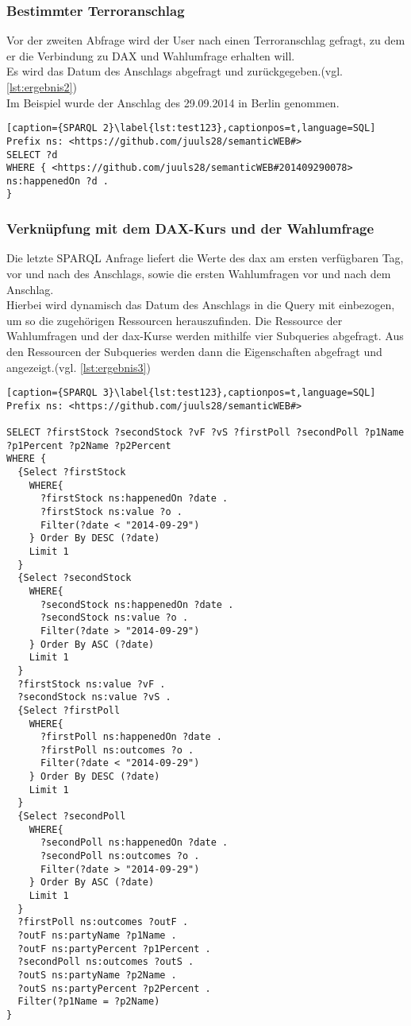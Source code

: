 \documentclass[a4paper,10pt,parskip]{article}
\begin{document}
\subsubsection{Bestimmter Terroranschlag}
Vor der zweiten Abfrage wird der User nach einen Terroranschlag gefragt, zu dem er die Verbindung zu DAX und Wahlumfrage erhalten will.\\Es wird das Datum des Anschlags abgefragt und zurückgegeben.(vgl. \ref{lst:ergebnis2})\\
Im Beispiel wurde der Anschlag des 29.09.2014 in Berlin genommen.
\begin{lstlisting}[caption={SPARQL 2}\label{lst:test123},captionpos=t,language=SQL] 
Prefix ns: <https://github.com/juuls28/semanticWEB#>
SELECT ?d
WHERE { <https://github.com/juuls28/semanticWEB#201409290078> ns:happenedOn ?d . 
}
\end{lstlisting}
\subsubsection{Verknüpfung mit dem DAX-Kurs und der Wahlumfrage}
Die letzte SPARQL Anfrage liefert die Werte des \ac{dax} am ersten verfügbaren Tag, vor und nach des Anschlags, sowie die ersten Wahlumfragen vor und nach dem Anschlag.\\
Hierbei wird dynamisch das Datum des Anschlags in die Query mit einbezogen, um so die zugehörigen Ressourcen herauszufinden. Die Ressource der Wahlumfragen und der \ac{dax}-Kurse werden mithilfe vier Subqueries abgefragt. Aus den Ressourcen der Subqueries werden dann die Eigenschaften abgefragt und angezeigt.(vgl. \ref{lst:ergebnis3})\\
\begin{lstlisting}[caption={SPARQL 3}\label{lst:test123},captionpos=t,language=SQL] 
Prefix ns: <https://github.com/juuls28/semanticWEB#>

SELECT ?firstStock ?secondStock ?vF ?vS ?firstPoll ?secondPoll ?p1Name ?p1Percent ?p2Name ?p2Percent
WHERE { 
  {Select ?firstStock
    WHERE{
      ?firstStock ns:happenedOn ?date .
      ?firstStock ns:value ?o .
      Filter(?date < "2014-09-29")
    } Order By DESC (?date)
    Limit 1
  }
  {Select ?secondStock
    WHERE{
      ?secondStock ns:happenedOn ?date .
      ?secondStock ns:value ?o .
      Filter(?date > "2014-09-29")
    } Order By ASC (?date)
    Limit 1
  }
  ?firstStock ns:value ?vF .
  ?secondStock ns:value ?vS .
  {Select ?firstPoll
    WHERE{
      ?firstPoll ns:happenedOn ?date .
      ?firstPoll ns:outcomes ?o .
      Filter(?date < "2014-09-29")
    } Order By DESC (?date)
    Limit 1
  }
  {Select ?secondPoll
    WHERE{
      ?secondPoll ns:happenedOn ?date .
      ?secondPoll ns:outcomes ?o .
      Filter(?date > "2014-09-29")
    } Order By ASC (?date)
    Limit 1
  }
  ?firstPoll ns:outcomes ?outF .
  ?outF ns:partyName ?p1Name .
  ?outF ns:partyPercent ?p1Percent .
  ?secondPoll ns:outcomes ?outS .
  ?outS ns:partyName ?p2Name .
  ?outS ns:partyPercent ?p2Percent .
  Filter(?p1Name = ?p2Name) 
}
\end{lstlisting}
\end{document}

